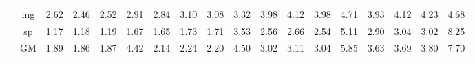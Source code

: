 \begin{table*}[]
\begin{center}
{\begin{tabular}{|c|c|rrrr|rrrr|rrrr|rrrr|}
 &  mg  &  2.62  & \cellcolor{blue!25} 2.46  &  2.52  &   2.91  &  2.84  &  3.10  & \cellcolor{blue!25} 3.08  &   3.32  &  3.98  &  4.12  & \cellcolor{blue!25} 3.98  &  4.71  &  3.93  &  4.12  &  4.23  &   4.68 \\
 &  sp  &  1.17  &  1.18  &  1.19  &   1.67  &  1.65  &  1.73  & \cellcolor{blue!25} 1.71  &   3.53  &  2.56  &  2.66  & \cellcolor{blue!25} 2.54  &  5.11  &  2.90  &  3.04  & \cellcolor{blue!25} 3.02  &   8.25 \\
 &  GM  &  1.89  & \cellcolor{blue!25} 1.86  &  1.87  &   4.42  &  2.14  &  2.24  & \cellcolor{blue!25} 2.20  &   4.50  &  3.02  &  3.11  & \cellcolor{blue!25} 3.04  &  5.85  &  3.63  &  3.69  &  3.80  &   7.70 \\
\hline 
\end{tabular} }

\end{center}
\end{table*}
